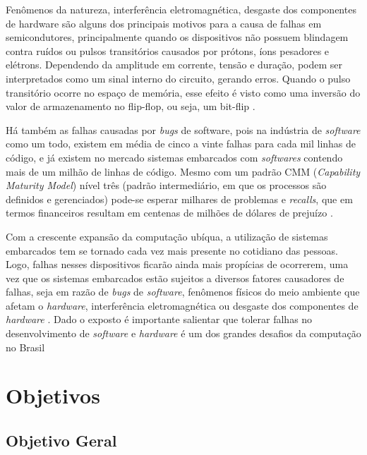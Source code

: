 Fenômenos da natureza, interferência eletromagnética, desgaste dos componentes de hardware \cite{Hsueh:1997} são alguns dos principais motivos para a causa de falhas em semicondutores, principalmente quando os dispositivos não possuem blindagem contra ruídos ou pulsos transitórios causados por prótons, íons pesadores e elétrons. Dependendo da amplitude em corrente, tensão e duração, podem ser interpretados como um sinal interno do circuito, gerando erros. Quando o pulso transitório ocorre no espaço de memória, esse efeito é visto como uma inversão do valor de armazenamento no flip-flop, ou seja, um bit-flip \cite{Ziegler:1996}. 

Há também as falhas causadas por \textit{bugs} de software, pois na indústria de \textit{software} como um todo, existem em média de cinco a vinte falhas para cada mil linhas de código, e já existem no mercado sistemas embarcados com \textit{softwares} contendo mais de um milhão de linhas de código. Mesmo com um padrão CMM (\textit {Capability Maturity Model}) nível três (padrão intermediário, em que os processos são definidos e gerenciados) \cite{Pressman:2005} pode-se esperar milhares de problemas e \textit{recalls}, que em termos financeiros resultam em centenas de milhões de dólares de prejuízo \cite{Taurion:2005}.

Com a crescente expansão da computação ubíqua, a utilização de sistemas embarcados tem se tornado cada vez mais presente no cotidiano das pessoas. Logo, falhas nesses dispositivos ficarão ainda mais propícias de ocorrerem, uma vez que os sistemas embarcados estão sujeitos a diversos fatores causadores de falhas, seja em razão de \textit{bugs} de \textit{software}, fenômenos físicos do meio ambiente que afetam o \textit{hardware}, interferência eletromagnética ou desgaste dos componentes de \textit{hardware} \cite{Kruger:2014}. Dado o exposto é importante salientar que tolerar falhas no desenvolvimento de \textit{software} e \textit{hardware} é um dos grandes desafios da computação no Brasil \cite{Carvalho:2006}


\section{Objetivos} \label{Sec:Objetivos}

\subsection{Objetivo Geral} \label{Sec:ObjetivoGeral}

